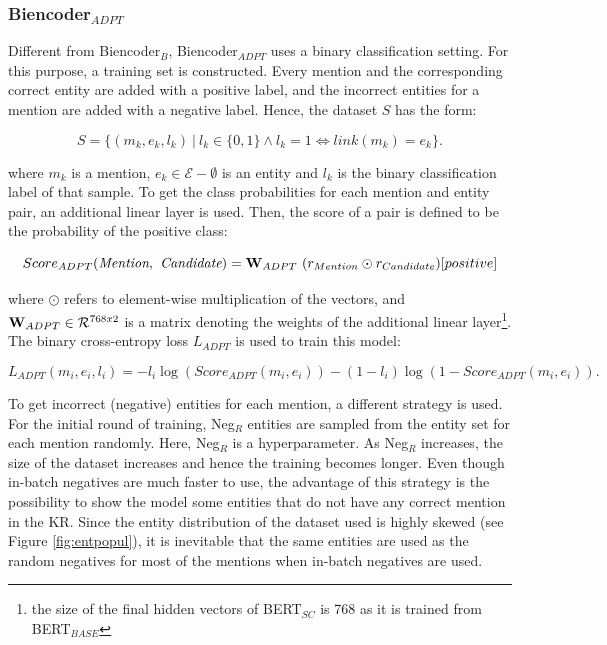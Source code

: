 \documentclass{report}
\theoremstyle{definition}
\theoremstyle{remark}
\begin{document}
\subsubsection{Biencoder$_{ADPT}$}
\label{sec:biencoderadaptexplanation}

Different from Biencoder$_{B}$, Biencoder$_{ADPT}$ uses a binary classification setting. For this purpose, a training set is constructed. Every mention and the corresponding correct entity are added with a positive label, and the incorrect entities for a mention are added with a negative label. Hence, the dataset $S$ has the form:

\begin{equation}
    S = \{ (m_k,e_k,l_k) \ | \ l_k \in \{0,1\} \land l_k=1 \iff link(m_k) = e_k \}.
\end{equation}

\noindent where $m_k$ is a mention, $e_k \in \mathcal{E}-\emptyset$ is an entity and $l_k$ is the binary classification label of that sample. To get the class probabilities for each mention and entity pair, an additional linear layer is used. Then, the score of a pair is defined to be the probability of the positive class:

\begin{equation}
    Score_{ADPT}(\textit{Mention},\textit{ Candidate}) = \bold{W}_{ADPT} \ (r_{Mention} \odot r_{Candidate}) [positive]
\end{equation}

\noindent where $\odot$ refers to element-wise multiplication of the vectors, and $\bold{W}_{ADPT} \in \mathcal{R}^{768x2}$ is a matrix denoting the weights of the additional linear layer\footnote{the size of the final hidden vectors of BERT$_{SC}$ is 768 as it is trained from BERT$_{BASE}$}. The binary cross-entropy loss $L_{ADPT}$ is used to train this model:

\begin{equation}
    L_{ADPT}(m_i,e_i,l_i) = - l_i \log (Score_{ADPT}(m_i,e_i)) - (1-l_i) \log (1-Score_{ADPT}(m_i,e_i)).
\end{equation}

To get incorrect (negative) entities for each mention, a different strategy is used. For the initial round of training, Neg$_{R}$ entities are sampled from the entity set for each mention randomly. Here, Neg$_{R}$ is a hyperparameter. As Neg$_{R}$ increases, the size of the dataset increases and hence the training becomes longer. Even though in-batch negatives are much faster to use, the advantage of this strategy is the possibility to show the model some entities that do not have any correct mention in the KR. Since the entity distribution of the dataset used is highly skewed (see Figure \ref{fig:entpopul}), it is inevitable that the same entities are used as the random negatives for most of the mentions when in-batch negatives are used.
\end{document}
